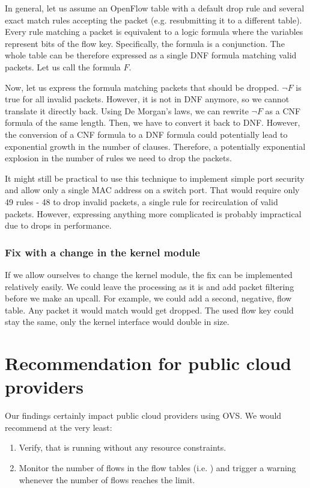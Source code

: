 In general, let us assume an OpenFlow table with a default drop rule and several exact match rules accepting the packet (e.g. resubmitting it to a different table). Every rule matching a packet is equivalent to a logic formula where the variables represent bits of the flow key. Specifically, the formula is a conjunction. The whole table can be therefore expressed as a single DNF formula matching valid packets. Let us call the formula $F$.

Now, let us express the formula matching packets that should be dropped. $\neg F$ is true for all invalid packets. However, it is not in DNF anymore, so we cannot translate it directly back. Using De Morgan's laws, we can rewrite $\neg F$ as a CNF formula of the same length. Then, we have to convert it back to DNF. However, the conversion of a CNF formula to a DNF formula could potentially lead to exponential growth in the number of clauses. Therefore, a potentially exponential explosion in the number of rules we need to drop the packets.

It might still be practical to use this technique to implement simple port security and allow only a single MAC address on a switch port. That would require only 49 rules - 48 to drop invalid packets, a single rule for recirculation of valid packets. However, expressing anything more complicated is probably impractical due to drops in performance.

\subsubsection{Fix with a change in the kernel module}

If we allow ourselves to change the kernel module, the fix can be implemented relatively easily. We could leave the processing as it is and add packet filtering before we make an upcall. For example, we could add a second, negative, flow table. Any packet it would match would get dropped. The used flow key could stay the same, only the kernel interface would double in size.


\section{Recommendation for public cloud providers}

Our findings certainly impact public cloud providers using OVS. We would recommend at the very least:

\begin{enumerate}
    \item Verify, that  is running without any resource constraints.
    \item Monitor the number of flows in the flow tables (i.e. ) and trigger a warning whenever the number of flows reaches the limit.
\end{enumerate}

